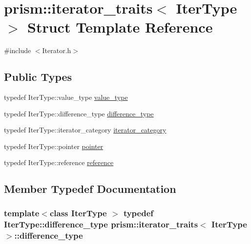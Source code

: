 \hypertarget{structprism_1_1iterator__traits}{}\section{prism\+:\+:iterator\+\_\+traits$<$ Iter\+Type $>$ Struct Template Reference}
\label{structprism_1_1iterator__traits}


{\ttfamily \#include $<$Iterator.\+h$>$}

\subsection*{Public Types}
\begin{DoxyCompactItemize}
\item 
typedef Iter\+Type\+::value\+\_\+type \hyperlink{structprism_1_1iterator__traits_a764c6740051f048bb81ba63d993e96cd}{value\+\_\+type}
\item 
typedef Iter\+Type\+::difference\+\_\+type \hyperlink{structprism_1_1iterator__traits_a8b7341f458751d350b7c797f9326d578}{difference\+\_\+type}
\item 
typedef Iter\+Type\+::iterator\+\_\+category \hyperlink{structprism_1_1iterator__traits_a2e20906a677a5a465bf343ff4281a010}{iterator\+\_\+category}
\item 
typedef Iter\+Type\+::pointer \hyperlink{structprism_1_1iterator__traits_a5ec4c84886d15b5efa1bb3fd0984dd71}{pointer}
\item 
typedef Iter\+Type\+::reference \hyperlink{structprism_1_1iterator__traits_af4ddc7a938960bb8c558e6eae9ee1548}{reference}
\end{DoxyCompactItemize}


\subsection{Member Typedef Documentation}
\subsubsection[{\texorpdfstring{difference\+\_\+type}{difference_type}}]{\setlength{\rightskip}{0pt plus 5cm}template$<$class Iter\+Type $>$ typedef Iter\+Type\+::difference\+\_\+type {\bf prism\+::iterator\+\_\+traits}$<$ Iter\+Type $>$\+::{\bf difference\+\_\+type}}\hypertarget{structprism_1_1iterator__traits_a8b7341f458751d350b7c797f9326d578}{}\label{structprism_1_1iterator__traits_a8b7341f458751d350b7c797f9326d578}
